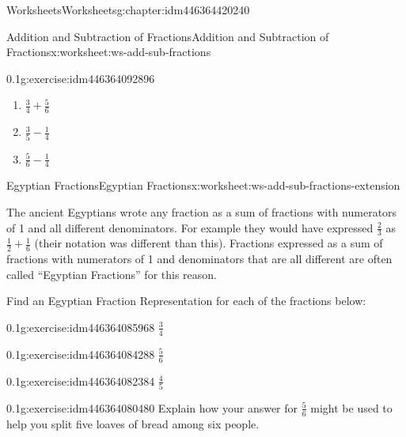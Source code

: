 \documentclass[twoside,11pt,]{book}
\begin{document}
\begin{chapterptx}{Worksheets}{}{Worksheets}{}{}{g:chapter:idm446364420240}
\begin{worksheet-section-numberless}{Addition and Subtraction of Fractions}{}{Addition and Subtraction of Fractions}{}{}{x:worksheet:ws-add-sub-fractions}
\begin{divisionexercise}{3}{}{0.1}{g:exercise:idm446364092896}
\begin{enumerate}[label=(\alph*)]
\item{}\(\frac{3}{4} + \frac{5}{6} \)%
\item{}\(\frac{3}{5} - \frac{1}{4} \)%
\item{}\(\frac{5}{6} - \frac{1}{4} \)%
\end{enumerate}
\end{divisionexercise}%
\end{worksheet-section-numberless}
\restoregeometry
%
%
\typeout{************************************************}
\typeout{************************************************}
%
\begin{worksheet-section-numberless}{Egyptian Fractions}{}{Egyptian Fractions}{}{}{x:worksheet:ws-add-sub-fractions-extension}
\begin{introduction}{}%
The ancient Egyptians wrote any fraction as a sum of fractions with numerators of 1 and all different denominators.  For example they would have expressed \(\frac{2}{3} \) as \(\frac{1}{2} + \frac{1}{6} \) (their notation was different than this).  Fractions expressed as a sum of fractions with numerators of 1 and denominators that are all different are often called “Egyptian Fractions” for this reason.%
\par
Find an Egyptian Fraction Representation for each of the fractions below:%
\end{introduction}%
\begin{divisionexercise}{1}{}{0.1}{g:exercise:idm446364085968}%
\(\frac{3}{4} \)%
\end{divisionexercise}%
\begin{divisionexercise}{2}{}{0.1}{g:exercise:idm446364084288}%
\(\frac{5}{6} \)%
\end{divisionexercise}%
\begin{divisionexercise}{3}{}{0.1}{g:exercise:idm446364082384}%
\(\frac{4}{5} \)%
\end{divisionexercise}%
\begin{divisionexercise}{4}{}{0.1}{g:exercise:idm446364080480}%
Explain how your answer for \(\frac{5}{6} \) might be used to help you split five loaves of bread among six people.%
\end{divisionexercise}%
\end{worksheet-section-numberless}
\restoregeometry
%
%
\typeout{************************************************}
\typeout{************************************************}

\end{chapterptx}
\end{document}
